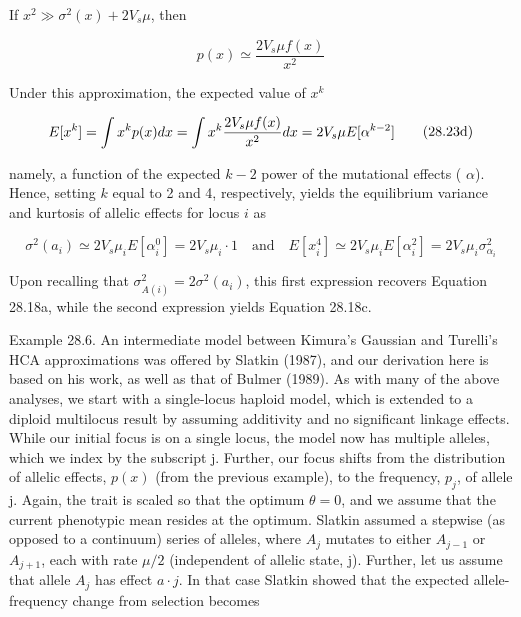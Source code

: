 \documentclass{article}
\begin{document}
If  $ x^2 \gg \sigma^2(x) + 2V_s\mu $, then

\begin{equation}
p(x)\simeq\frac{2V_{s}\mu f(x)}{x^{2}}
\tag{28.23c}
\label{eq:28_23c}
\end{equation}

Under this approximation, the expected value of  $ x^{k} $

\begin{equation}
\begin{align*}E[x^k]=\int x^kp(x)dx=\int x^k{2V_s\mu f(x)\over x^2}dx=2V_s\mu E[\alpha^{k-2}]\end{align*}
\tag{28.23d}
\label{eq:28_23d}
\end{equation}

namely, a function of the expected  $ k - 2 $ power of the mutational effects ( $ \alpha $). Hence, setting  $ k $ equal to 2 and 4, respectively, yields the equilibrium variance and kurtosis of allelic effects for locus  $ i $ as

\begin{equation}
\sigma^{2}(a_{i})\simeq2V_{s}\mu_{i}E[\alpha_{i}^{0}]=2V_{s}\mu_{i}\cdot1\quad\mathrm{a n d}\quad E[x_{i}^{4}]\simeq2V_{s}\mu_{i}E[\alpha_{i}^{2}]=2V_{s}\mu_{i}\sigma_{\alpha_{i}}^{2}
\end{equation}

Upon recalling that  $ \sigma_{A(i)}^2 = 2\sigma^2(a_i) $, this first expression recovers Equation 28.18a, while the second expression yields Equation 28.18c.

Example 28.6. An intermediate model between Kimura's Gaussian and Turelli's HCA approximations was offered by Slatkin (1987), and our derivation here is based on his work, as well as that of Bulmer (1989). As with many of the above analyses, we start with a single-locus haploid model, which is extended to a diploid multilocus result by assuming additivity and no significant linkage effects. While our initial focus is on a single locus, the model now has multiple alleles, which we index by the subscript j. Further, our focus shifts from the distribution of allelic effects,  $ p(x) $ (from the previous example), to the frequency,  $ p_j $, of allele j. Again, the trait is scaled so that the optimum  $ \theta = 0 $, and we assume that the current phenotypic mean resides at the optimum. Slatkin assumed a stepwise (as opposed to a continuum) series of alleles, where  $ A_j $ mutates to either  $ A_{j-1} $ or  $ A_{j+1} $, each with rate  $ \mu/2 $ (independent of allelic state, j). Further, let us assume that allele  $ A_j $ has effect  $ a \cdot j $. In that case Slatkin showed that the expected allele-frequency change from selection becomes
\end{document}
